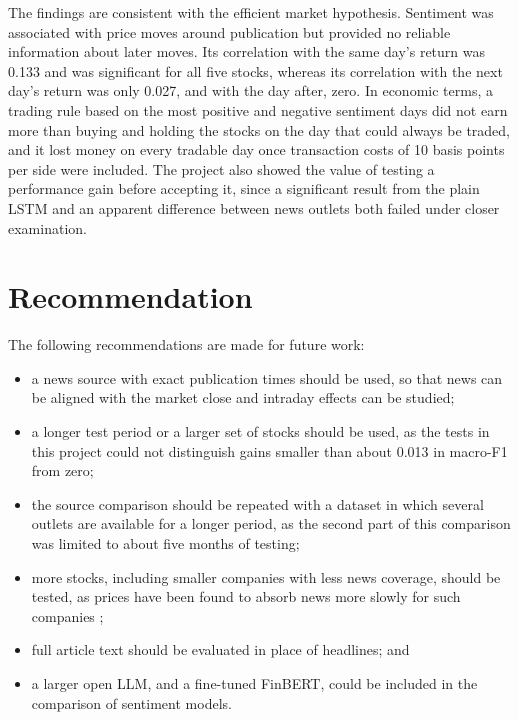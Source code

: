 The findings are consistent with the efficient market hypothesis. Sentiment was associated with price moves around publication but provided no reliable information about later moves. Its correlation with the same day's return was 0.133 and was significant for all five stocks, whereas its correlation with the next day's return was only 0.027, and with the day after, zero. In economic terms, a trading rule based on the most positive and negative sentiment days did not earn more than buying and holding the stocks on the day that could always be traded, and it lost money on every tradable day once transaction costs of 10 basis points per side were included. The project also showed the value of testing a performance gain before accepting it, since a significant result from the plain LSTM and an apparent difference between news outlets both failed under closer examination.

\section{Recommendation}
The following recommendations are made for future work:
\begin{itemize}
\item a news source with exact publication times should be used, so that news can be aligned with the market close and intraday effects can be studied;
\item a longer test period or a larger set of stocks should be used, as the tests in this project could not distinguish gains smaller than about 0.013 in macro-F1 from zero;
\item the source comparison should be repeated with a dataset in which several outlets are available for a longer period, as the second part of this comparison was limited to about five months of testing;
\item more stocks, including smaller companies with less news coverage, should be tested, as prices have been found to absorb news more slowly for such companies \parencite{hong2000bad, ke2019predicting};
\item full article text should be evaluated in place of headlines; and
\item a larger open LLM, and a fine-tuned FinBERT, could be included in the comparison of sentiment models.
\end{itemize}
